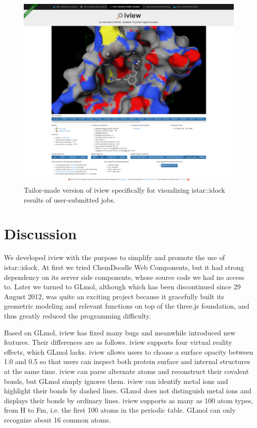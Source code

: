 \begin{figure}
\begin{center}
\includegraphics[width=\linewidth]{../iview/idock.png}
\end{center}
\caption{Tailor-made version of iview specifically for visualizing istar::idock results of user-submitted jobs.}
\label{iview:idock}
\end{figure}

\section{Discussion}

We developed iview with the purpose to simplify and promote the use of istar::idock. At first we tried ChemDoodle Web Components, but it had strong dependency on its server side components, whose source code we had no access to. Later we turned to GLmol, although which has been discontinued since 29 August 2012, was quite an exciting project because it gracefully built its geometric modeling and relevant functions on top of the three.js foundation, and thus greatly reduced the programming difficulty.

Based on GLmol, iview has fixed many bugs and meanwhile introduced new features. Their differences are as follows. iview supports four virtual reality effects, which GLmol lacks. iview allows users to choose a surface opacity between 1.0 and 0.5 so that users can inspect both protein surface and internal structures at the same time. iview can parse alternate atoms and reconstruct their covalent bonds, but GLmol simply ignores them. iview can identify metal ions and highlight their bonds by dashed lines. GLmol does not distinguish metal ions and displays their bonds by ordinary lines. iview supports as many as 100 atom types, from H to Fm, i.e. the first 100 atoms in the periodic table. GLmol can only recognize about 16 common atoms.

